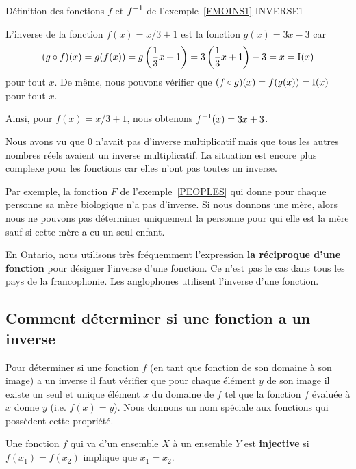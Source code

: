 {
{Définition des fonctions $f$ et $\displaystyle f^{-1}$ de l'exemple~\ref{FMOINS1}}
{INVERSE1}

\begin{egg}
L'inverse de la fonction $f(x) = x/3 + 1$ est la fonction $g(x) = 3x - 3$ car
\[
(g \circ f)(x) = g(f(x)) = g\left( \frac{1}{3}x + 1 \right)
= 3\left(\frac{1}{3}x+1\right) - 3 = x = \operatorname{I}(x)
\]
pour tout $x$.  De même, nous pouvons vérifier que
$(f \circ g)(x) = f(g(x)) = \operatorname{I}(x)$ pour tout $x$.

Ainsi, pour $f(x) = x/3 + 1$, nous obtenons $\displaystyle f^{-1}(x) = 3x + 3$.
\end{egg}

Nous avons vu que $0$ n'avait pas d'inverse multiplicatif mais que tous les
autres nombres réels avaient un inverse multiplicatif.  La situation
est encore plus complexe pour les fonctions car elles n'ont pas toutes
un inverse.

\begin{egg}
Par exemple, la fonction $F$ de l'exemple~\ref{PEOPLES} qui donne pour
chaque personne sa mère biologique n'a pas d'inverse.  Si nous donnons une
mère, alors nous ne pouvons pas déterminer uniquement la personne pour qui
elle est la mère sauf si cette mère a eu un seul enfant.
\end{egg}

\begin{rmk}
En Ontario, nous utilisons très fréquemment l'expression
{\bfseries la réciproque d'une fonction} pour désigner l'inverse
d'une fonction.  Ce n'est pas le cas dans tous les pays de la
francophonie.  Les anglophones utilisent l'inverse d'une fonction. 
\end{rmk}

\subsection{Comment déterminer si une fonction a un inverse}

Pour déterminer si une fonction $f$ (en tant que fonction de son
domaine à son image) a un inverse il faut vérifier que pour chaque
élément $y$ de son image il existe un seul et unique élément $x$ du
domaine de $f$ tel que la fonction $f$ évaluée à $x$ donne $y$
(i.e. $f(x)=y$).  Nous donnons un nom spéciale aux fonctions qui
possèdent cette propriété.

\begin{defn} 
Une fonction $f$ qui va d'un ensemble $X$ à un ensemble $Y$ est
{\bfseries injective} si $f(x_1) = f(x_2)$
implique que $x_1 = x_2$.
\end{defn}

}
